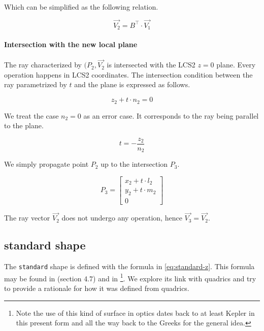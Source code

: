 Which can be simplified as the following relation.

\begin{equation}
\overrightarrow{V_2} = B^\top \cdot \overrightarrow{V_1}
\end{equation}

\paragraph{Intersection with the new local plane}
The ray characterized by $(P_2, \overrightarrow{V_2}$ is intersected
with the LCS2 $z = 0$ plane. Every operation happens in LCS2 coordinates.
The intersection condition between the ray parametrized by $t$ and the
plane is expressed as follows.

\begin{equation}
z_2 + t \cdot n_2 = 0
\end{equation}

We treat the case $n_2 = 0$ as an error case. It corresponds to the ray
being parallel to the plane.

\begin{equation}
t = - \frac{z_2}{n_2}
\end{equation}

We simply propagate point $P_2$ up to the intersection $P_3$.

\begin{equation}
P_3 = \begin{bmatrix}
x_2 + t \cdot l_2 \\
y_2 + t \cdot m_2 \\
0
\end{bmatrix}
\end{equation}

The ray vector $\overrightarrow{V_2}$ does not undergo any operation, hence
$\overrightarrow{V_3} = \overrightarrow{V_2}$.

\subsection{standard shape}
The \lstinline{standard} shape is defined with the formula in
\cref{eq:standard-z}. This formula may be found in \cite{Welford:1986}
(section 4.7) and in \cite{Greynolds:2002} \footnote{Note the use of this kind
of surface in optics dates back to at least Kepler in this present form and all
the way back to the Greeks for the general idea.}.  We explore its link with
quadrics and try to provide a rationale for how it was defined from quadrics.

